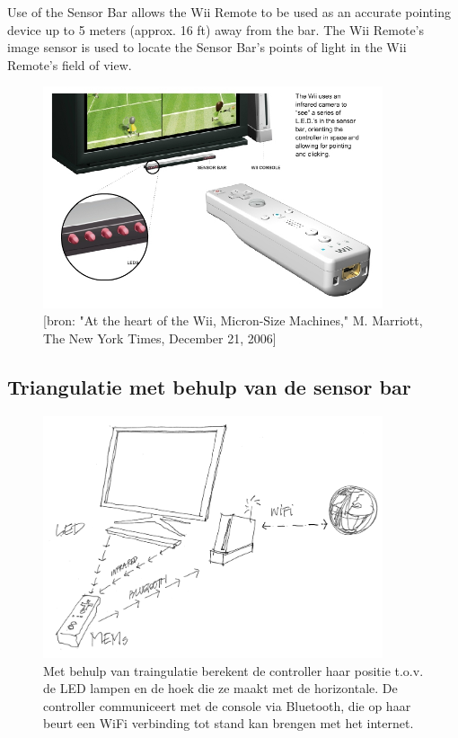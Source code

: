 \documentclass[11pt]{article}
\begin{document}
Use of the Sensor Bar allows the Wii Remote to be used as an accurate pointing device up to 5 meters (approx. 16 ft) away from the bar. The Wii Remote's image sensor is used to locate the Sensor Bar's points of light in the Wii Remote's field of view. 
\begin{figure}[h]
\begin{center}
\includegraphics[width=10cm]{newYorkTimesWiiController02.jpg}
\caption{[bron: "At the heart of the Wii, Micron-Size Machines," M. Marriott, The New York Times, December 21, 2006]}
\end{center}
\end{figure}

\newpage
\subsection{Triangulatie met behulp van de sensor bar}
\begin{figure}[h]\begin{center}
\includegraphics[width=10cm]{wiiGebruikteTechnologie.jpg}
\caption{Met behulp van traingulatie berekent de controller haar positie t.o.v. de LED lampen en de hoek die ze maakt met de horizontale. De controller communiceert met de console via Bluetooth, die op haar beurt een WiFi verbinding tot stand kan brengen met het internet.}
\end{center} \end{figure}
\end{document}
